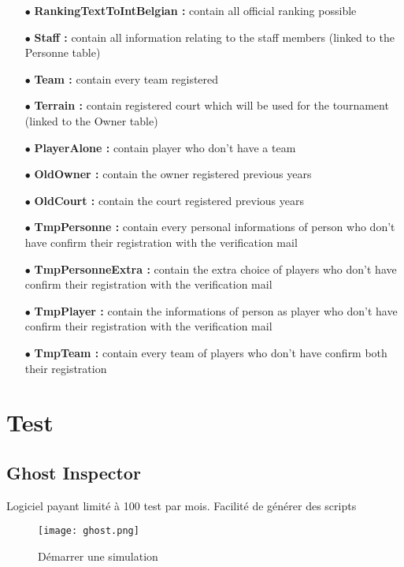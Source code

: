 \documentclass{article}
\begin{document}
\begin{itemize}
\item[$\bullet$]{\textbf{RankingTextToIntBelgian :}} contain all official ranking possible

\item[$\bullet$]{\textbf{Staff  :}} contain all information relating to the staff members (linked to the Personne table)

\item[$\bullet$]{\textbf{Team :}} contain every team registered

\item[$\bullet$]{\textbf{Terrain :}} contain registered court which will be used for the tournament (linked to the Owner table)

\item[$\bullet$]{\textbf{PlayerAlone :}} contain player who don't have a team

\item[$\bullet$]{\textbf{OldOwner :}} contain the owner registered previous years

\item[$\bullet$]{\textbf{OldCourt :}} contain the court registered previous years

\item[$\bullet$]{\textbf{TmpPersonne :}} contain every personal informations of person who don't have confirm their registration with the verification mail

\item[$\bullet$]{\textbf{TmpPersonneExtra :}} contain the extra choice of players who don't have confirm their registration with the verification mail

\item[$\bullet$]{\textbf{TmpPlayer :}} contain the informations of person as player who don't have confirm their registration with the verification mail

\item[$\bullet$]{\textbf{TmpTeam :}} contain every team of players who don't have confirm both their registration
\end{itemize}


\section{Test}
\subsection{Ghost Inspector}

Logiciel payant limité à 100 test par mois. Facilité de générer des scripts\\
\begin{figure}[H]
\centering
\texttt{[image: ghost.png]}
\caption{Démarrer une simulation}
\end{figure}
\end{document}

